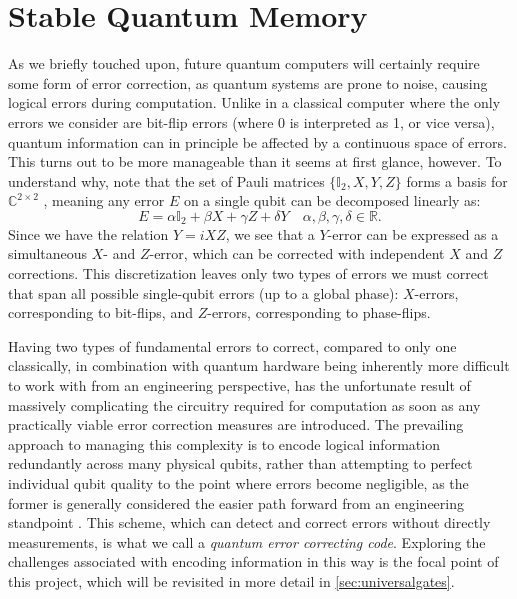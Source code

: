 \section{Stable Quantum Memory}
As we briefly touched upon, future quantum computers will certainly require some form of error correction, as quantum systems are prone to noise, causing logical errors during computation. Unlike in a classical computer where the only errors we consider are bit-flip errors (where 0 is interpreted as 1, or vice versa), quantum information can in principle be affected by a continuous space of errors. This turns out to be more manageable than it seems at first glance, however. To understand why, note that the set of Pauli matrices $\{\mathbb{I}_2, X, Y, Z\}$ forms a basis for $\mathbb{C}^{2 \times 2}$ \cite{Nielsen_Chuang_2010}, meaning any error $E$ on a single qubit can be decomposed linearly as: 
\[
E = \alpha \mathbb{I}_2 + \beta X + \gamma Z + \delta Y \quad \alpha, \beta, \gamma, \delta \in \mathbb{R}.
\]
Since we have the relation $Y = i X Z$, we see that a $Y$-error can be expressed as a simultaneous $X$- and $Z$-error, which can be corrected with independent $X$ and $Z$ corrections. This discretization leaves only two types of errors we must correct that span all possible single-qubit errors (up to a global phase): $X$-errors, corresponding to bit-flips, and $Z$-errors, corresponding to phase-flips.

Having two types of fundamental errors to correct, compared to only one classically, in combination with quantum hardware being inherently more difficult to work with from an engineering perspective, has the unfortunate result of massively complicating the circuitry required for computation as soon as any practically viable error correction measures are introduced. The prevailing approach to managing this complexity is to encode logical information redundantly across many physical qubits, rather than attempting to perfect individual qubit quality to the point where errors become negligible, as the former is generally considered the easier path forward from an engineering standpoint \cite{jaques2024ches_presentation}. This scheme, which can detect and correct errors without directly measurements, is what we call a \emph{quantum error correcting code}. Exploring the challenges associated with encoding information in this way is the focal point of this project, which will be revisited in more detail in \cref{sec:universalgates}.


